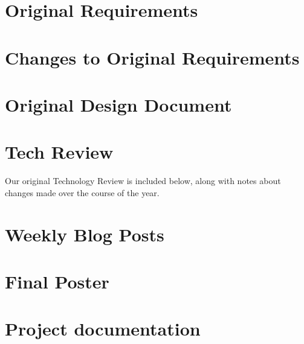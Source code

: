 \documentclass[10pt,draftclsnofoot,onecolumn]{IEEEtran}
\begin{document}
\newpage
\section{Original Requirements} %

\newpage
\section{Changes to Original Requirements} %

\newpage
\section{Original Design Document} %

\newpage
\section{Tech Review} %
Our original Technology Review is included below, along with notes about changes made over the course of the year.


\newpage
\section{Weekly Blog Posts} %

\newpage
\section{Final Poster} %

\newpage
\section{Project documentation} %
\end{document}
